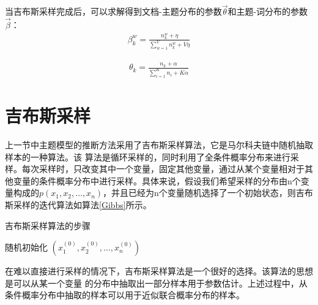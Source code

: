 当吉布斯采样完成后，可以求解得到文档-主题分布的参数$\vec\theta$和主题-词分布的参数$\vec\beta$：
\begin{equation} 
	\begin{aligned}
	\beta_{k}^w = \frac{n_{k}^w + \eta}{\sum_{w=1}^V n_{k}^w + V\eta}
	\end{aligned}
\label{phizw }
\end{equation}

\begin{equation} 
	\begin{aligned}
	\theta_{k} = \frac{n_{k}+\alpha}{\sum_{i=1}^K n_{i} + K\alpha}
	\end{aligned}
\label{pz-dmm}
\end{equation}

\section{吉布斯采样}\label{GibbsSampling}
上一节中主题模型的推断方法采用了吉布斯采样算法，它是马尔科夫链中随机抽取样本的一种算法。该 算法是循环采样的，同时利用了全条件概率分布来进行采样。每次采样时，只改变其中一个变量，固定其他变量，通过从某个变量相对于其他变量的条件概率分布中进行采样。具体来说，假设我们希望采样的分布由n个变量构成的$p(x_1,x_2,\dots,x_n)$，并且已经为n个变量随机选择了一个初始状态，则吉布斯采样的迭代算法如算法\ref{Gibbs}所示。
\begin{algorithm}[tb]
    \caption{吉布斯采样算法的步骤}
    \label{Gibbs}
    \LinesNumbered
    随机初始化 $(x_1^{(0)},x_2^{(0)},\dots,x_n^{(0)})$\;
\end{algorithm}

在难以直接进行采样的情况下，吉布斯采样算法是一个很好的选择。该算法的思想是可以从某一个变量 的分布中抽取出一部分样本用于参数估计。上述过程中，从条件概率分布中抽取的样本可以用于近似联合概率分布的样本。

